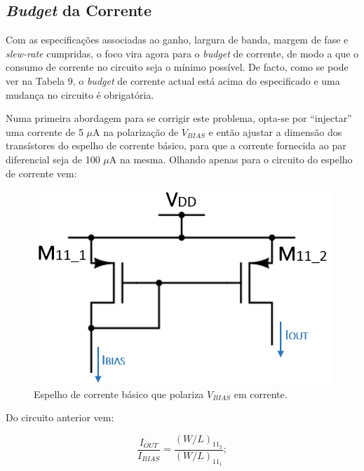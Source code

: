 \documentclass[11pt]{article}
\numberwithin{equation}{section}
\begin{document}

\subsection{\textit{Budget} da Corrente}

Com as especificações associadas ao ganho, largura de banda, margem de fase e \textit{slew-rate} cumpridas, o foco vira agora para o \textit{budget} de corrente, de modo a que o consumo de corrente no circuito seja o mínimo possível. De facto, como se pode ver na Tabela 9, o \textit{budget} de corrente actual está acima do especificado e uma mudança no circuito é obrigatória.

Numa primeira abordagem para se corrigir este problema, opta-se por ``injectar'' uma corrente de 5 $\mu$A na polarização de $V_{BIAS}$ e então ajustar a dimensão dos transístores do espelho de corrente básico, para que a corrente fornecida ao par diferencial seja de 100 $\mu$A na mesma. Olhando apenas para o circuito do espelho de corrente vem:

\begin{figure}[H]
	\centering
	\includegraphics[keepaspectratio=true, scale=0.45]{teoricas/cmirror}
	\vspace{-0.5em}
	\caption{Espelho de corrente básico que polariza $V_{BIAS}$ em corrente.}
	\vspace{-0.8em}
\end{figure}

Do circuito anterior vem:

\vspace{-3mm}
\begin{equation}
	\frac{I_{OUT}}{I_{BIAS}} = \frac{\left(W/L\right)_{11_{2}}}{\left(W/L\right)_{11_{1}}};
\end{equation}
\end{document}
